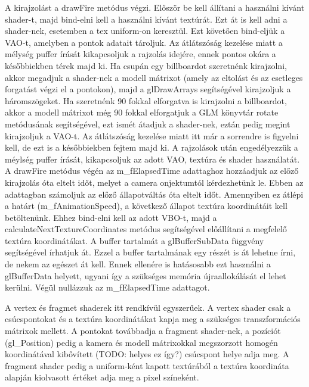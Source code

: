 A kirajzolást a drawFire metódus végzi. Először be kell állítani a használni kívánt shader-t, majd bind-elni kell a használni kívánt textúrát. Ezt át is kell adni a shader-nek, esetemben a tex uniform-on keresztül. Ezt követően bind-eljük a VAO-t, amelyben a pontok adatait tároljuk. Az átlátszóság kezelése miatt a mélység puffer írását kikapcsoljuk a rajzolás idejére, ennek pontos okára a későbbiekben térek majd ki. Ha csupán egy billboardot szeretnénk kirajzolni, akkor megadjuk a shader-nek a modell mátrixot (amely az eltolást és az esetleges forgatást végzi el a pontokon), majd a glDrawArrays segítségével kirajzoljuk a háromszögeket. Ha szeretnénk 90 fokkal elforgatva is kirajzolni a billboardot, akkor a modell mátrixot még 90 fokkal elforgatjuk a GLM könyvtár rotate metódusának segítségével, ezt ismét átadjuk a shader-nek, eztán pedig megint kirajzoljuk a VAO-t. Az átlátszóság kezelése miatt itt már a sorrendre is figyelni kell, de ezt is a későbbiekben fejtem majd ki. A rajzolások után engedélyezzük a méylség puffer írását, kikapcsoljuk az adott VAO, textúra és shader használatát. A drawFire metódus végén az m\_fElapsedTime adattaghoz hozzáadjuk az előző kirajzolás óta eltelt időt, melyet a camera onjektumtól kérdezhetünk le. Ebben az adattagban számoljuk az előző állapotváltás óta eltelt időt. Amennyiben ez átlépi a határt (m\_fAnimationSpeed), a következő állapot textúra koordinátáit kell betöltenünk. Ehhez bind-elni kell az adott VBO-t, majd a calculateNextTextureCoordinates metódus segítségével előállítani a megfelelő textúra koordinátákat. A buffer tartalmát a glBufferSubData függvény segítségével írhatjuk át. Ezzel a buffer tartalmának egy részét is át lehetne írni, de nekem az egészet át kell. Ennek ellenére is hatásosabb ezt használni a glBufferData helyett, ugyani így a szükséges memória újraallokálását el lehet kerülni. Végül nullázzuk az m\_fElapsedTime adattagot.

A vertex és fragmet shaderek itt rendkívül egyszerűek. A vertex shader csak a csúcspontokat és a textúra koordinátákat kapja meg a szükséges transzformációs mátrixok mellett. A pontokat továbbadja a fragment shader-nek, a pozíciót (gl\_Position) pedig a kamera és modell mátrixokkal megszorzott homogén koordinátával kibővített (TODO: helyes ez így?) csúcspont helye adja meg. A fragment shader pedig a uniform-ként kapott textúrából a textúra koordináta alapján kiolvasott értéket adja meg a pixel színeként. 

